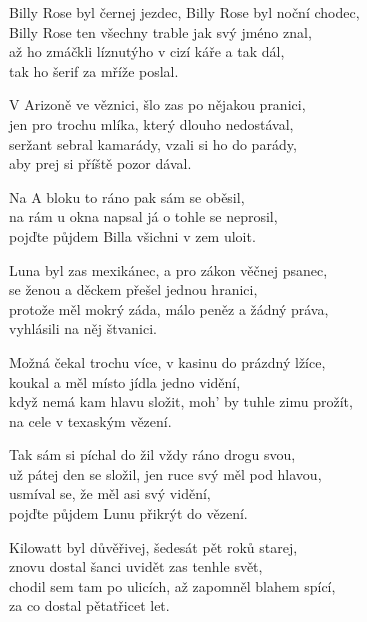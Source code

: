 
\ve{}
Billy Rose byl černej jezdec, Billy Rose byl noční chodec,\\
Billy Rose ten všechny trable jak svý jméno znal,\\
až ho zmáčkli líznutýho v cizí káře a tak dál,\\
tak ho šerif za mříže poslal. 

\ve{}
V Arizoně ve věznici, šlo zas po nějakou pranici,\\
jen pro trochu mlíka, který dlouho nedostával,\\
seržant sebral kamarády, vzali si ho do parády,\\
aby prej si příště pozor dával. 

\cho{}
Na A bloku to ráno pak sám se oběsil,\\
na rám u okna napsal já o tohle se neprosil,\\
pojďte půjdem Billa všichni v zem uloit.

\ve{}
Luna byl zas mexikánec, a pro zákon věčnej psanec,\\
se ženou a děckem přešel jednou hranici,\\
protože měl mokrý záda, málo peněz a žádný práva,\\
vyhlásili na něj štvanici. 

\ve{}
Možná čekal trochu více, v kasinu do prázdný lžíce,\\
koukal a měl místo jídla jedno vidění,\\
když nemá kam hlavu složit, moh' by tuhle zimu prožít,\\
na cele v texaským vězení. 

\cho{}
Tak sám si píchal do žil vždy ráno drogu svou,\\
už pátej den se složil, jen ruce svý měl pod hlavou,\\
usmíval se, že měl asi svý vidění,\\
pojďte půjdem Lunu přikrýt do vězení.

\ve{}
Kilowatt byl důvěřivej, šedesát pět roků starej,\\
znovu dostal šanci uvidět zas tenhle svět,\\
chodil sem tam po ulicích, až zapomněl blahem spící,\\
za co dostal pětatřicet let. 

